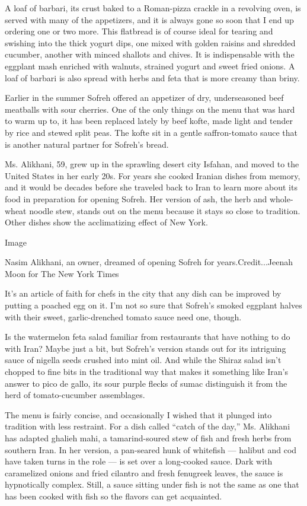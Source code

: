 A loaf of barbari, its crust baked to a Roman-pizza crackle in a
revolving oven, is served with many of the appetizers, and it is always
gone so soon that I end up ordering one or two more. This flatbread is
of course ideal for tearing and swishing into the thick yogurt dips, one
mixed with golden raisins and shredded cucumber, another with minced
shallots and chives. It is indispensable with the eggplant mash enriched
with walnuts, strained yogurt and sweet fried onions. A loaf of barbari
is also spread with herbs and feta that is more creamy than briny.

Earlier in the summer Sofreh offered an appetizer of dry, underseasoned
beef meatballs with sour cherries. One of the only things on the menu
that was hard to warm up to, it has been replaced lately by beef kofte,
made light and tender by rice and stewed split peas. The kofte sit in a
gentle saffron-tomato sauce that is another natural partner for Sofreh's
bread.

Ms. Alikhani, 59, grew up in the sprawling desert city Isfahan, and
moved to the United States in her early 20s. For years she cooked
Iranian dishes from memory, and it would be decades before she traveled
back to Iran to learn more about its food in preparation for opening
Sofreh. Her version of ash, the herb and whole-wheat noodle stew, stands
out on the menu because it stays so close to tradition. Other dishes
show the acclimatizing effect of New York.

Image

Nasim Alikhani, an owner, dreamed of opening Sofreh for
years.Credit...Jeenah Moon for The New York Times

It's an article of faith for chefs in the city that any dish can be
improved by putting a poached egg on it. I'm not so sure that Sofreh's
smoked eggplant halves with their sweet, garlic-drenched tomato sauce
need one, though.

Is the watermelon feta salad familiar from restaurants that have nothing
to do with Iran? Maybe just a bit, but Sofreh's version stands out for
its intriguing sauce of nigella seeds crushed into mint oil. And while
the Shiraz salad isn't chopped to fine bits in the traditional way that
makes it something like Iran's answer to pico de gallo, its sour purple
flecks of sumac distinguish it from the herd of tomato-cucumber
assemblages.

The menu is fairly concise, and occasionally I wished that it plunged
into tradition with less restraint. For a dish called ``catch of the
day,'' Ms. Alikhani has adapted ghalieh mahi, a tamarind-soured stew of
fish and fresh herbs from southern Iran. In her version, a pan-seared
hunk of whitefish --- halibut and cod have taken turns in the role ---
is set over a long-cooked sauce. Dark with caramelized onions and fried
cilantro and fresh fenugreek leaves, the sauce is hypnotically complex.
Still, a sauce sitting under fish is not the same as one that has been
cooked with fish so the flavors can get acquainted.

